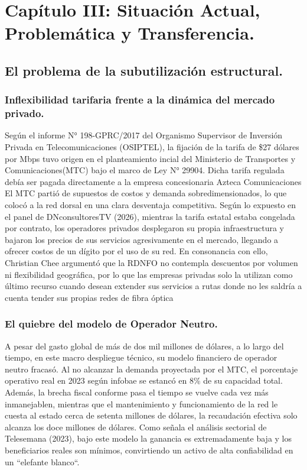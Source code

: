 \section{Capítulo III: Situación Actual, Problemática y Transferencia.}

\subsection{El problema de la subutilización estructural.}
\subsubsection{Inflexibilidad tarifaria frente a la dinámica del mercado privado.}

Según el informe N° 198-GPRC/2017 del Organismo Supervisor de Inversión Privada en Telecomunicaciones 
(OSIPTEL), la fijación de la tarifa de \$27 dólares por Mbps tuvo origen en el planteamiento 
incial del Ministerio de Transportes y Comunicaciones(MTC) bajo el marco de Ley N° 29904.  
Dicha tarifa regulada debía ser pagada directamente a la empresa concesionaria Azteca Comunicaciones
El MTC partió de supuestos de costos y demanda sobredimensionados, lo que colocó a la red dorsal 
en una clara desventaja competitiva.
Según lo expuesto en el panel de DNconsultoresTV (2026), mientras la tarifa estatal 
estaba congelada por contrato, los operadores privados desplegaron su propia infraestructura y bajaron los
precios de sus servicios agresivamente en el mercado, llegando a ofrecer costos de un dígito por el uso de su red. 
En consonancia con ello,
Christian Chee argumentó que la RDNFO no contempla descuentos por volumen ni flexibilidad geográfica, por lo que 
las empresas privadas solo la utilizan como último recurso cuando desean extender sus servicios a rutas donde no 
les saldría a cuenta tender sus propias redes de fibra óptica
\subsubsection{El quiebre del modelo de Operador Neutro.}

A pesar del gasto global de más de dos mil millones de dólares, a lo largo del tiempo, en 
este macro despliegue técnico, su modelo financiero de operador neutro fracasó.
Al no alcanzar la demanda proyectada por el MTC, el porcentaje operativo real en 2023 según infobae se estancó en 8\%  
de su capacidad total. Además, la brecha fiscal conforme pasa el tiempo se vuelve cada vez más inmanejablen, mientras que el mantenimiento
y funcionamiento de la red le cuesta al estado cerca de setenta millones de dólares, la recaudación
efectiva solo alcanza los doce millones de dólares.
Como señala el análisis sectorial de Telesemana (2023), bajo este modelo la ganancia es extremadamente 
baja y los beneficiarios reales son mínimos, 
convirtiendo un activo de alta confiabilidad en un ``elefante blanco``.

